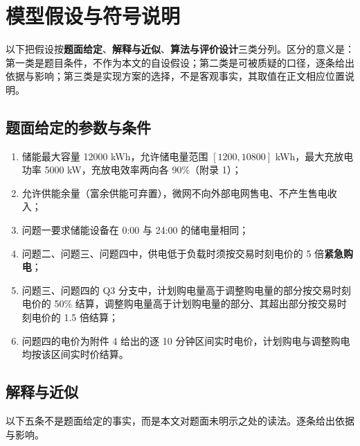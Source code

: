 
\section{模型假设与符号说明}

以下把假设按\textbf{题面给定}、\textbf{解释与近似}、\textbf{算法与评价设计}三类分列。区分的意义是：第一类是题目条件，不作为本文的自设假设；第二类是可被质疑的口径，逐条给出依据与影响；第三类是实现方案的选择，不是客观事实，其取值在正文相应位置说明。

\subsection{题面给定的参数与条件}

\begin{enumerate}
  \item 储能最大容量 12000 kWh，允许储电量范围 $[1200,10800]$ kWh，最大充放电功率 5000 kW，充放电效率两向各 90\%（附录 1）；
  \item 允许供能余量（富余供能可弃置），微网不向外部电网售电、不产生售电收入；
  \item 问题一要求储能设备在 0:00 与 24:00 的储电量相同；
  \item 问题二、问题三、问题四中，供电低于负载时须按交易时刻电价的 5 倍\textbf{紧急购电}；
  \item 问题三、问题四的 Q3 分支中，计划购电量高于调整购电量的部分按交易时刻电价的 50\% 结算，调整购电量高于计划购电量的部分、其超出部分按交易时刻电价的 1.5 倍结算；
  \item 问题四的电价为附件 4 给出的逐 10 分钟区间实时电价，计划购电与调整购电均按该区间实时价结算。
\end{enumerate}

\subsection{解释与近似}

以下五条不是题面给定的事实，而是本文对题面未明示之处的读法。逐条给出依据与影响。


